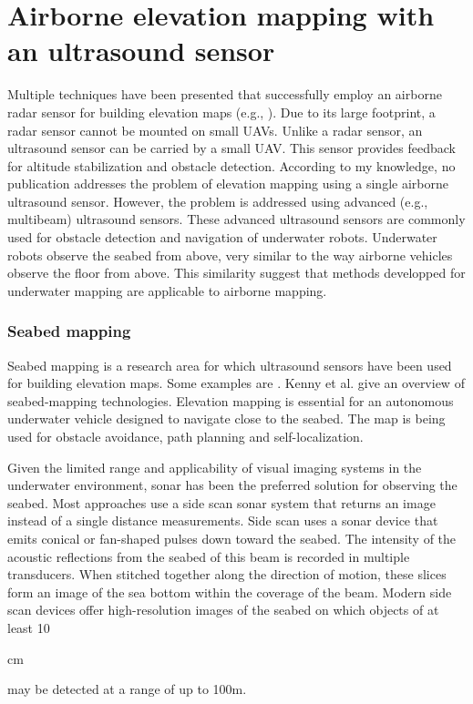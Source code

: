 \section{Airborne elevation mapping with an ultrasound sensor}
\label{sec:related-research-elevation-mapping}
Multiple techniques have been presented that successfully employ an airborne radar sensor for building elevation maps (e.g., \cite{foessel2000radar, weiß2006airborne}).
Due to its large footprint, a radar sensor cannot be mounted on small UAVs.
Unlike a radar sensor, an ultrasound sensor can be carried by a small UAV.
This sensor provides feedback for altitude stabilization and obstacle detection.
According to my knowledge, no publication addresses the problem of elevation mapping using a single airborne ultrasound sensor.
However, the problem is addressed using advanced (e.g., multibeam) ultrasound sensors.
These advanced ultrasound sensors are commonly used for obstacle detection and navigation of underwater robots.
Underwater robots observe the seabed from above, very similar to the way airborne vehicles observe the floor from above.
This similarity suggest that methods developped for underwater mapping are applicable to airborne mapping.

\subsubsection{Seabed mapping}
Seabed mapping is a research area for which ultrasound sensors have been used for building elevation maps. Some examples are \cite{johnson1996seafloor,strauss1999multibeam,zerr1996three,evans2002three}.
Kenny et al. \cite{kenny2003overview} give an overview of seabed-mapping technologies.
Elevation mapping is essential for an autonomous underwater vehicle designed to navigate close to the seabed.
The map is being used for obstacle avoidance, path planning and self-localization.

Given the limited range and applicability of visual imaging systems in the underwater environment,
sonar has been the preferred solution \cite{blondel1997handbook} for observing the seabed.
Most approaches use a side scan sonar system that returns an image instead of a single distance measurements.
Side scan uses a sonar device that emits conical or fan-shaped pulses down toward the seabed.
The intensity of the acoustic reflections from the seabed of this beam is recorded in multiple transducers.
When stitched together along the direction of motion, these slices form an image of the sea bottom within the coverage of the beam.
Modern side scan devices offer high-resolution images of the seabed on which objects of at least 10\begin{small}cm\end{small} may be detected at a range of up to 100\small{m}.


